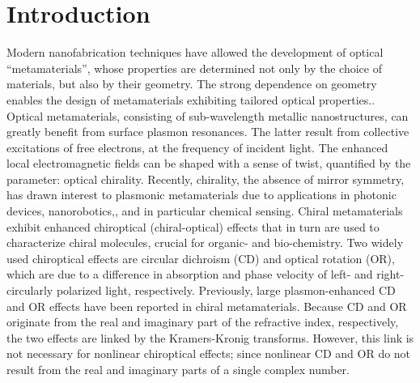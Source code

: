 \section{Introduction}\label{sec:results:OAinPlanarNanohelices:introduction}
Modern nanofabrication techniques have allowed the development of optical “metamaterials”, whose properties are determined not only by the choice of materials, but also by their geometry. The strong dependence on geometry enables the design of metamaterials exhibiting tailored optical properties.\cite{Pendry2004a, Alu2007, Kauranen2012, Meinzer2014, Moitra2015, Cong2015, Prudencio2016}. 
Optical metamaterials, consisting of sub-wavelength metallic nanostructures, can greatly benefit from surface plasmon resonances. The latter result from collective excitations of free electrons, at the frequency of incident light. The enhanced local electromagnetic fields can be shaped with a sense of twist, quantified by the parameter: optical chirality.\cite{Tang2010, Schaferling2012}
Recently, chirality, the absence of mirror symmetry, has drawn interest to plasmonic metamaterials due to applications in photonic devices,\cite{Rizza2015, Esposito2016, Hou2016} nanorobotics,\cite{Urban2015, Schamel2013a}, and in particular chemical sensing.
Chiral metamaterials exhibit enhanced chiroptical (chiral-optical) effects\cite{Schaferling2014, Karimullah2015, Canaguier-Durand2014} that in turn are used to characterize chiral molecules, crucial for organic- and bio-chemistry.\cite{Zhao2017, Hendry2010, Tullius2015}
Two widely used chiroptical effects are circular dichroism (CD) and optical rotation (OR), which are due to a difference in absorption and phase velocity of left- and right- circularly polarized light, respectively. Previously, large plasmon-enhanced CD and OR effects have been reported in chiral metamaterials.\cite{Papakostas2003, Kuwata-Gonokami2005a, Decker2007, Plum2007, Gansel2011}
Because CD and OR originate from the real and imaginary part of the refractive index, respectively, the two effects are linked by the Kramers-Kronig transforms.\cite{Barron2004, Parson2007, Govorov2011}
However, this link is not necessary for nonlinear chiroptical effects; since nonlinear CD and OR do not result from the real and imaginary parts of a single complex number. 

